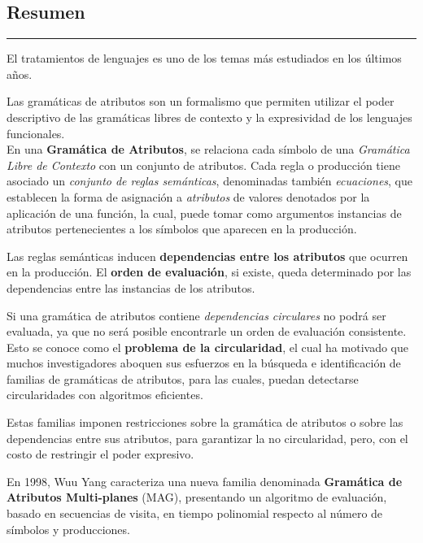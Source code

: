 \documentclass[a4paper,11pt]{ThesisStyle}
\begin{document}



\begin{vcenterpage}

\section*{Resumen}
\noindent\rule[2pt]{\textwidth}{0.5pt}

El tratamientos de lenguajes es uno de los temas más estudiados en los últimos años.

Las gramáticas de atributos son un formalismo que permiten utilizar el poder descriptivo de las gramáticas libres de contexto y la expresividad de los lenguajes funcionales.\\ 

En una \textbf{Gramática de Atributos}, se relaciona cada símbolo de una \textit{Gramática Libre de Contexto} con un conjunto de atributos. Cada regla o producción tiene asociado un \textit{conjunto de reglas semánticas}, denominadas también \textit{ecuaciones}, que establecen la forma de asignación a \textit{atributos} de valores denotados por la aplicación de una función, la cual, puede tomar como argumentos instancias de atributos pertenecientes a los símbolos que aparecen en la producción.

Las reglas semánticas inducen \textbf{dependencias entre los atributos} que ocurren en la producción. El \textbf{orden de evaluación}, si existe, queda determinado por las dependencias entre las instancias de los atributos.

Si una gramática de atributos contiene \textit{dependencias circulares} no podrá ser evaluada, ya que no será posible encontrarle un orden de evaluación consistente. Esto se conoce como el \textbf{problema de la circularidad}, el cual ha motivado que muchos investigadores aboquen sus esfuerzos en la búsqueda e identificación de familias de gramáticas de atributos, para las cuales, puedan detectarse circularidades con algoritmos eficientes.

Estas familias imponen restricciones sobre la gramática de atributos o sobre las dependencias entre sus atributos, para garantizar la no circularidad, pero, con el costo de restringir el poder expresivo.

En 1998, Wuu Yang caracteriza una nueva familia denominada \textbf{Gramática de Atributos Multi-planes} (MAG), presentando un algoritmo de evaluación, basado en secuencias de visita, en tiempo polinomial respecto al número de símbolos y producciones.\\ 


\end{vcenterpage}
\end{document}
